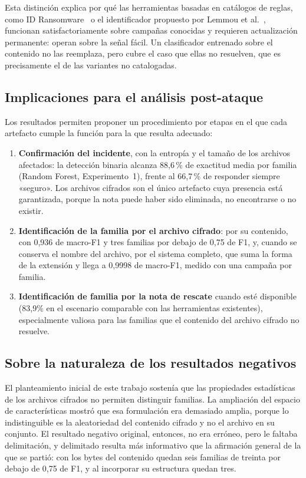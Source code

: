 Esta distinción explica por qué las herramientas basadas en catálogos de reglas, como ID Ransomware~\cite{idransomware} o el identificador propuesto por Lemmou et al.~\cite{paper_5_note_files}, funcionan satisfactoriamente sobre campañas conocidas y requieren actualización permanente: operan sobre la señal fácil. Un clasificador entrenado sobre el contenido no las reemplaza, pero cubre el caso que ellas no resuelven, que es precisamente el de las variantes no catalogadas.

\subsection{Implicaciones para el análisis post-ataque}

Los resultados permiten proponer un procedimiento por etapas en el que cada artefacto cumple la función para la que resulta adecuado:

\begin{enumerate}
\item \textbf{Confirmación del incidente}, con la entropía y el tamaño de los archivos afectados: la detección binaria alcanza 88,6\,\% de exactitud media por familia (Random Forest, Experimento~1), frente al 66,7\,\% de responder siempre «seguro». Los archivos cifrados son el único artefacto cuya presencia está garantizada, porque la nota puede haber sido eliminada, no encontrarse o no existir.
\item \textbf{Identificación de la familia por el archivo cifrado}: por su contenido, con 0,936 de macro-F1 y tres familias por debajo de 0,75 de F1, y, cuando se conserva el nombre del archivo, por el sistema completo, que suma la forma de la extensión y llega a 0,9998 de macro-F1, medido con una campaña por familia.
\item \textbf{Identificación de familia por la nota de rescate} cuando esté disponible (83,9\% en el escenario comparable con las herramientas existentes), especialmente valiosa para las familias que el contenido del archivo cifrado no resuelve.
\end{enumerate}

\subsection{Sobre la naturaleza de los resultados negativos}

El planteamiento inicial de este trabajo sostenía que las propiedades estadísticas de los archivos cifrados no permiten distinguir familias. La ampliación del espacio de características mostró que esa formulación era demasiado amplia, porque lo indistinguible es la aleatoriedad del contenido cifrado y no el archivo en su conjunto. El resultado negativo original, entonces, no era erróneo, pero le faltaba delimitación, y delimitado resulta más informativo que la afirmación general de la que se partió: con los bytes del contenido quedan seis familias de treinta por debajo de 0,75 de F1, y al incorporar su estructura quedan tres.

